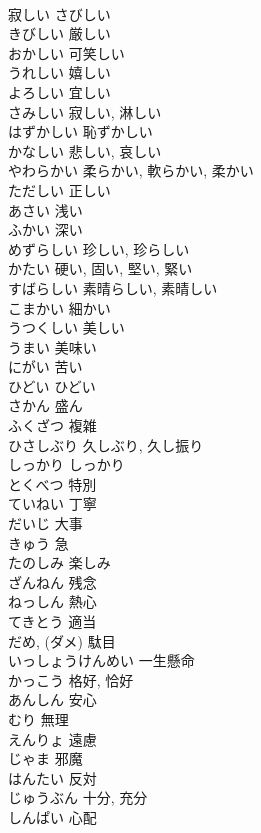 \documentclass[8pt]{extreport}
\begin{document}
\begin{CJK}{UTF8}{min}
\\	寂しい		さびしい	
\\	きびしい	厳しい
\\	おかしい	可笑しい
\\	うれしい	嬉しい
\\	よろしい	宜しい
\\	さみしい	寂しい, 淋しい
\\	はずかしい	恥ずかしい
\\	かなしい	悲しい, 哀しい
\\	やわらかい	柔らかい, 軟らかい, 柔かい
\\	ただしい	正しい
\\	あさい	浅い
\\	ふかい	深い
\\	めずらしい	珍しい, 珍らしい
\\	かたい	硬い, 固い, 堅い, 緊い
\\	すばらしい	素晴らしい, 素晴しい
\\	こまかい	細かい
\\	うつくしい	美しい
\\	うまい	美味い
\\	にがい	苦い
\\	ひどい	ひどい
\\	さかん	盛ん
\\	ふくざつ	複雑
\\	ひさしぶり	久しぶり, 久し振り
\\	しっかり	しっかり
\\	とくべつ	特別
\\	ていねい	丁寧
\\	だいじ	大事
\\	きゅう	急
\\	たのしみ	楽しみ
\\	ざんねん	残念
\\	ねっしん	熱心
\\	てきとう	適当
\\	だめ, (ダメ)	駄目
\\	いっしょうけんめい	一生懸命
\\	かっこう	格好, 恰好
\\	あんしん	安心
\\	むり	無理
\\	えんりょ	遠慮
\\	じゃま	邪魔
\\	はんたい	反対
\\	じゅうぶん	十分, 充分
\\	しんぱい	心配

\end{CJK}
\end{document}
